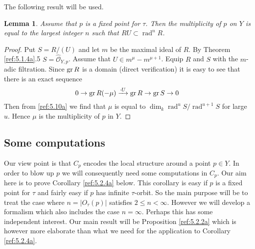 \documentclass{amsproc}
\def\Oscr{{\mathcal O}}
\def\gr{\mathop{\text{gr}}}
\def\rad{\operatorname {rad}}
\def\gr{\operatorname {gr}}
\def\gr{\operatorname {gr}}
\def\r{\rightarrow}
\let\oldtext\text
\def\text#1{\oldtext{\upshape #1}}
\newtheorem{lemmas}{Lemma}[subsection]
\theoremstyle{definition}
\theoremstyle{remark}
\numberwithin{equation}{section}
\numberwithin{table}{section}
\numberwithin{figure}{section}
\def\gr{\mathop{\text{gr}}}
\begin{document}
The following result will be used. 
\begin{lemmas} 
\label{ref:5.1.8a}
Assume that $p$ is a fixed point for $\tau$. Then the
  multiplicity of $p$ on $Y$ is equal to the largest integer $n$ such
  that $RU\subset \rad^n R$.
\end{lemmas}
\begin{proof} Put $S=R/(U)$ and let $m$ be the maximal ideal of
  $R$. By Theorem \ref{ref:5.1.4a}.5 
  $S=\hat{\Oscr}_{Y,p}$.  Assume that $U\in m^\mu-m^{\mu+1}$. 
  Equip $R$ and $S$ with the $m$-adic
  filtration.  Since $\gr R$ is a domain (direct
  verification) it is easy to see that there is an exact sequence
\begin{equation}
\label{ref:5.10a}
0\r \gr R(-\mu)\xrightarrow{\cdot U} \gr R\r \gr S\r 0
\end{equation}
 Then from \eqref{ref:5.10a} we find
that $\mu$ is equal to
   $\dim_k \rad^u S/\rad^{u+1}S$ for large $u$. Hence $\mu$ is the
  multiplicity of $p$ in $Y$.
\end{proof}

\subsection{Some computations}

\leavevmode 

Our view point is that $C_p$ encodes the local structure around a
point $p\in Y$. In order to blow up $p$ we will consequently need some
computations in $C_p$. Our aim here is to prove Corollary
\ref{ref:5.2.4a} below. This corollary is easy if $p$ is a fixed point
for $\tau$ and fairly easy if $p$ has infinite $\tau$-orbit. So the
main purpose will be to treat the case where $n=|O_\tau(p)|$ satisfies
$2\le n<\infty$. However we will develop a formalism which also
includes the case $n=\infty$. Perhaps this has some independent
interest. Our main result will be Proposition \ref{ref:5.2.2a} which
is however more elaborate than what we need for the application to
Corollary \ref{ref:5.2.4a}.
\end{document}
